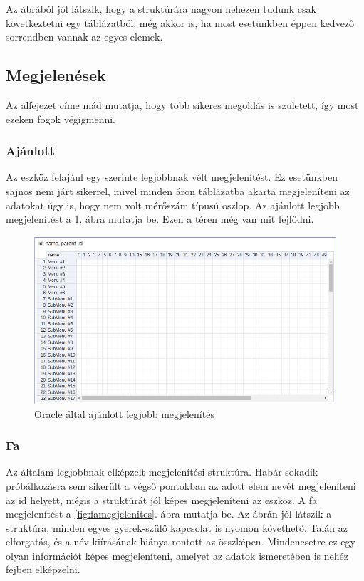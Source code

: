 	Az ábrából jól látszik, hogy a struktúrára nagyon nehezen tudunk csak következtetni egy táblázatból, még akkor is, ha most esetünkben éppen kedvező sorrendben vannak az egyes elemek.

	\subsection{Megjelenések}
	Az alfejezet címe mád mutatja, hogy több sikeres megoldás is született, így most ezeken fogok végigmenni.
	
		\subsubsection{Ajánlott}
		Az eszköz felajánl egy szerinte legjobbnak vélt megjelenítést. Ez esetünkben sajnos nem járt sikerrel, mivel minden áron táblázatba akarta megjeleníteni az adatokat úgy is, hogy nem volt mérőszám típusú oszlop. Az ajánlott legjobb megjelenítést a \ref{fig:legjobbmegjelenites}. ábra mutatja be. Ezen a téren még van mit fejlődni.
		
		\begin{figure}[h!]
			\centering
			\includegraphics[width=1.0\linewidth]{keve_imgs/legjobbmegjelenites}
			\caption{Oracle által ajánlott legjobb megjelenítés}
			\label{fig:legjobbmegjelenites}
		\end{figure}
	
		\subsubsection{Fa}
		Az általam legjobbnak elképzelt megjelenítési struktúra. Habár sokadik próbálkozásra sem sikerült a végső pontokban az adott elem nevét megjeleníteni az id helyett, mégis a struktúrát jól képes megjeleníteni az eszköz. A fa megjelenítést a \ref{fig:famegjelenites}. ábra mutatja be. Az ábrán jól látszik a struktúra, minden egyes gyerek-szülő kapcsolat is nyomon követhető. Talán az elforgatás, és a név kiírásának hiánya rontott az összképen. Mindenesetre ez egy olyan információt képes megjeleníteni, amelyet az adatok ismeretében is nehéz fejben elképzelni.		
		

